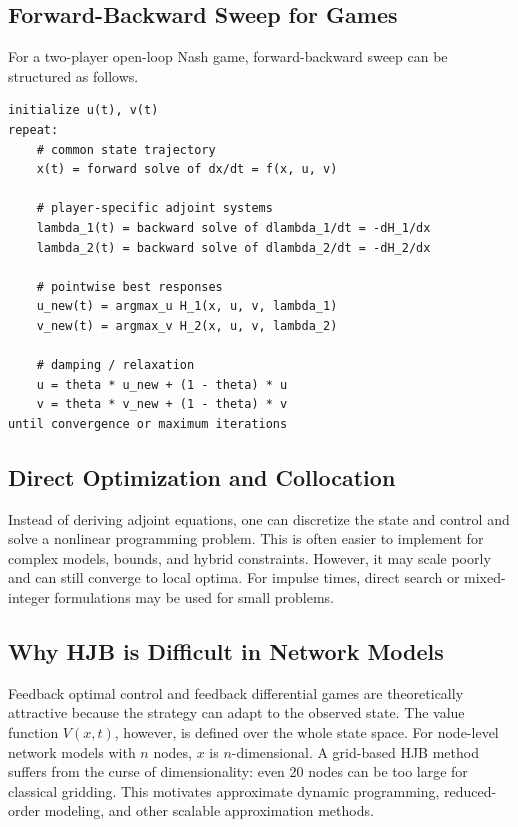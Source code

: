 \documentclass[11pt,a4paper]{article}
\begin{document}
\subsection{Forward-Backward Sweep for Games}

For a two-player open-loop Nash game, forward-backward sweep can be structured as follows.

\begin{lstlisting}[caption={Forward-backward sweep for an open-loop Nash game.}]
initialize u(t), v(t)
repeat:
    # common state trajectory
    x(t) = forward solve of dx/dt = f(x, u, v)

    # player-specific adjoint systems
    lambda_1(t) = backward solve of dlambda_1/dt = -dH_1/dx
    lambda_2(t) = backward solve of dlambda_2/dt = -dH_2/dx

    # pointwise best responses
    u_new(t) = argmax_u H_1(x, u, v, lambda_1)
    v_new(t) = argmax_v H_2(x, u, v, lambda_2)

    # damping / relaxation
    u = theta * u_new + (1 - theta) * u
    v = theta * v_new + (1 - theta) * v
until convergence or maximum iterations
\end{lstlisting}

\subsection{Direct Optimization and Collocation}

Instead of deriving adjoint equations, one can discretize the state and control and solve a nonlinear programming problem. This is often easier to implement for complex models, bounds, and hybrid constraints. However, it may scale poorly and can still converge to local optima. For impulse times, direct search or mixed-integer formulations may be used for small problems.

\subsection{Why HJB is Difficult in Network Models}

Feedback optimal control and feedback differential games are theoretically attractive because the strategy can adapt to the observed state. The value function $V(x,t)$, however, is defined over the whole state space. For node-level network models with $n$ nodes, $x$ is $n$-dimensional. A grid-based HJB method suffers from the curse of dimensionality: even 20 nodes can be too large for classical gridding. This motivates approximate dynamic programming, reduced-order modeling, and other scalable approximation methods.
\end{document}
